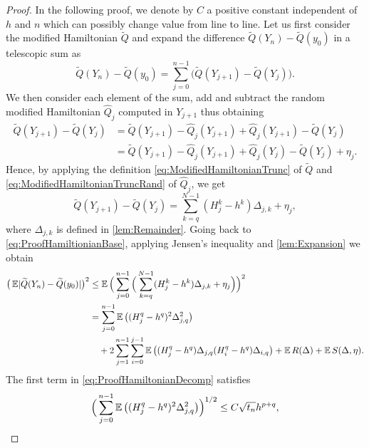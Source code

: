 \documentclass[10pt]{article}
\begin{document}
\begin{proof} In the following proof, we denote by $C$ a positive constant independent of $h$ and $n$ which can possibly change value from line to line. Let us first consider the modified Hamiltonian $\tilde Q$ and expand the difference $\tilde Q(Y_n) - \tilde Q(y_0)$ in a telescopic sum as
	\begin{equation}\label{eq:ProofHamiltionianBase}
	\tilde Q(Y_n) - \tilde Q(y_0) = \sum_{j=0}^{n-1} \big(\tilde Q(Y_{j+1}) - \tilde Q(Y_j)\big).
	\end{equation}
	We then consider each element of the sum, add and subtract the random modified Hamiltonian $\hat Q_j$ computed in $Y_{j+1}$ thus obtaining
	\begin{equation}
	\begin{aligned}
	\tilde Q(Y_{j+1}) - \tilde Q(Y_j) &= \tilde Q(Y_{j+1}) - \hat Q_j(Y_{j+1}) + \hat Q_j(Y_{j+1}) - \tilde Q(Y_j) \\
	&= \tilde Q(Y_{j+1}) - \hat Q_j(Y_{j+1}) + \hat Q_j(Y_j) - \tilde Q(Y_j) + \eta_j.
	\end{aligned}
	\end{equation}
	Hence, {by applying the definition \eqref{eq:ModifiedHamiltonianTrunc} of $\tilde Q$ and \eqref{eq:ModifiedHamiltonianTruncRand} of $\hat Q_j$}, we get
	\begin{equation}
	\tilde Q(Y_{j+1}) - \tilde Q(Y_j) = \sum_{k=q}^{N-1} (H_j^k - h^k)\Delta_{j,k} + \eta_j,
	\end{equation}
	where $\Delta_{j,k}$ is defined in \cref{lem:Remainder}.	Going back to \eqref{eq:ProofHamiltionianBase}, applying Jensen's inequality and \cref{lem:Expansion} we obtain
	\begin{equation}\label{eq:ProofHamiltonianDecomp}
	\begin{aligned}
	\big(\operatorname{\mathbb{E}} \lvert\widetilde Q(Y_n) - \widetilde Q(y_0)\rvert\big)^2 &\leq \operatorname{\mathbb{E}} \Big(\sum_{j=0}^{n-1} \Big(\sum_{k=q}^{N-1}(H_j^k - h^k)\Delta_{j,k} + \eta_j \Big) \Big)^2 \\
	&= \sum_{j=0}^{n-1}\operatorname{\mathbb{E}}\big((H_j^q - h^q)^2 \Delta_{j,q}^2\big) \\
	&\quad + 2\sum_{j=1}^{n-1}\sum_{i=0}^{j-1} \operatorname{\mathbb{E}}\big((H_j^q - h^q)\Delta_{j,q}(H_i^q - h^q) \Delta_{i,q}\big) + \operatorname{\mathbb{E}} R(\Delta) + \operatorname{\mathbb{E}} S(\Delta, \eta).
	\end{aligned}
	\end{equation}
	The first term in \eqref{eq:ProofHamiltonianDecomp} satisfies
	\begin{equation}\label{eq:BoundFirstTerm}
		\Big(\sum_{j=0}^{n-1}\E\big((H_j^q - h^q)^2 \Delta_{j,q}^2\big)\Big)^{1/2} \leq C \sqrt{t_n} h^{p+q},

\end{equation}
\end{proof}
\end{document}
